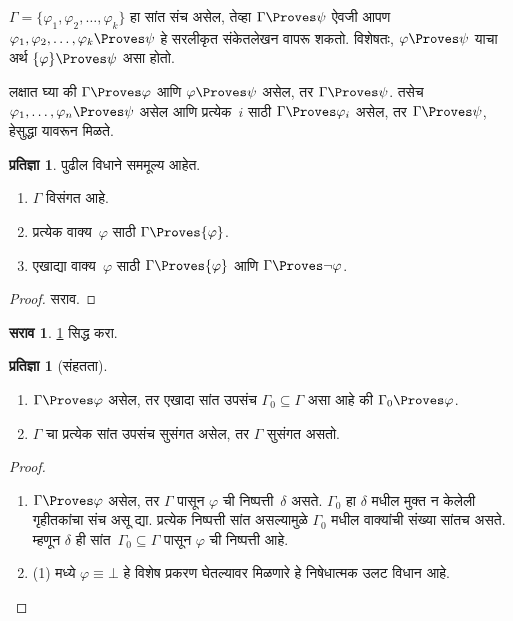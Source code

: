 \documentclass[11pt,a4paper,openany]{book}
\theoremstyle{definition}
\newtheorem{prop}[defn]{प्रतिज्ञा}
\newtheorem{prob}{सराव}[chapter]
\newcommand{\lfalse}{\bot}
\newcommand{\ident}{\equiv}
\begin{document}
$\Gamma = \{\varphi_1, \varphi_2, \ldots, \varphi_k\}$ हा सांत संच असेल, तेव्हा
$\Gamma \Proves \psi$ ऐवजी आपण $\varphi_1,\varphi_2,\ldots,\varphi_k \Proves \psi$ हे
सरलीकृत संकेतलेखन वापरू शकतो. विशेषतः, $\varphi \Proves \psi$ याचा अर्थ
$\{\varphi\} \Proves \psi$ असा होतो.

लक्षात घ्या की $\Gamma \Proves \varphi$ आणि $\varphi
\Proves \psi$ असेल, तर $\Gamma \Proves \psi$. तसेच $\varphi_1,
\dots, \varphi_n \Proves \psi$ असेल आणि प्रत्येक~$i$ साठी $\Gamma \Proves \varphi_i$
असेल, तर $\Gamma \Proves \psi$, हेसुद्धा यावरून मिळते.

\begin{prop}
\label{fol:ntd:ptn:prop:incons}
पुढील विधाने सममूल्य आहेत.
    \begin{enumerate}
      \item \( \Gamma \) विसंगत आहे.
      \item प्रत्येक वाक्य~\( {\varphi} \) साठी \( \Gamma \Proves {\varphi} \).
      \item एखाद्या वाक्य~\( {\varphi} \) साठी \( \Gamma \Proves {\varphi} \) आणि \( \Gamma \Proves \lnot {\varphi} \).
    \end{enumerate}
\end{prop}

\begin{proof}
सराव.
\end{proof}


\begin{prob}
\ref{fol:ntd:ptn:prop:incons} सिद्ध करा.
\end{prob}




\begin{prop}[संहतता]
  \label{fol:ntd:ptn:prop:proves-compact}
  \begin{enumerate}
  \item $\Gamma \Proves \varphi$ असेल, तर एखादा सांत उपसंच $\Gamma_0
    \subseteq \Gamma$ असा आहे की $\Gamma_0 \Proves \varphi$.
  \item $\Gamma$ चा प्रत्येक सांत उपसंच सुसंगत असेल, तर $\Gamma$ सुसंगत
    असतो.
  \end{enumerate}
\end{prop}

\begin{proof}
  \begin{enumerate}
    \item $\Gamma \Proves \varphi$ असेल, तर $\Gamma$ पासून $\varphi$ ची
      निष्पत्ती~$\delta$ असते. $\Gamma_0$ हा $\delta$ मधील
      मुक्त न केलेली गृहीतकांचा संच असू द्या. प्रत्येक निष्पत्ती सांत
      असल्यामुळे $\Gamma_0$ मधील वाक्यांची संख्या सांतच असते.
      म्हणून $\delta$ ही सांत~$\Gamma_0 \subseteq \Gamma$ पासून $\varphi$ ची
      निष्पत्ती आहे.
    \item (1) मध्ये $\varphi
      \ident \lfalse$ हे विशेष प्रकरण घेतल्यावर मिळणारे हे निषेधात्मक उलट
      विधान आहे.
  \end{enumerate}
\end{proof}
\end{document}

